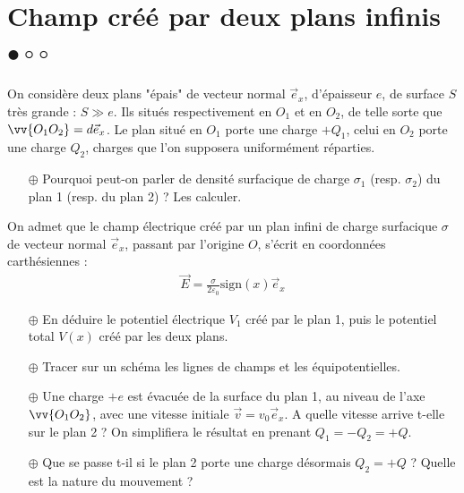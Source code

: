 \documentclass{report}
\begin{document}
\newpage

\section*{Champ créé par deux plans infinis $\bullet\circ\circ$}

On considère deux plans "épais" de vecteur normal $\vec{e}_x$, d'épaisseur $e$, de surface $S$ très grande : $S\gg e$. Ils situés respectivement en $O_1$ et en $O_2$, de telle sorte que $\vv{O_1O_2}=d\vec{e}_x$. Le plan situé en $O_1$ porte une charge $+Q_1$, celui en $O_2$ porte une charge $Q_2$, charges que l'on supposera uniformément réparties. 

\begin{itemize}

	\item[$\oplus$] Pourquoi peut-on parler de densité surfacique de charge $\sigma_1$ (resp. $\sigma_2$) du plan 1 (resp. du plan 2) ? Les calculer.

\end{itemize}

On admet que le champ électrique créé par un plan infini de charge surfacique $\sigma$ de vecteur normal $\vec{e}_x$, passant par l'origine $O$, s'écrit en coordonnées carthésiennes :
\begin{align*}
	\vec{E}=\frac{\sigma}{2\varepsilon_0}\mathrm{sign}(x)\vec{e}_x
\end{align*}

\begin{itemize}

	\item[$\oplus$] En déduire le potentiel électrique $V_1$ créé par le plan 1, puis le potentiel total $V(x)$ créé par les deux plans.
	
	\item[$\oplus$] Tracer sur un schéma les lignes de champs et les équipotentielles. 
	
	\item[$\oplus$] Une charge $+e$ est évacuée de la surface du plan 1, au niveau de l'axe $\vv{O_1O_2}$, avec une vitesse initiale $\vec{v}=v_0\vec{e}_x$. A quelle vitesse arrive t-elle sur le plan 2 ? On simplifiera le résultat en prenant $Q_1=-Q_2=+Q$.
	
	\item[$\oplus$] Que se passe t-il si le plan 2 porte une charge désormais $Q_2=+Q$ ? Quelle est la nature du mouvement ? 

\end{itemize}
\end{document}
